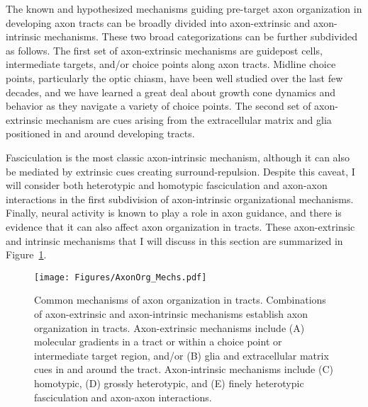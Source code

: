 \label{sec:MoleculesMechanisms}
The known and hypothesized mechanisms guiding pre-target axon organization in developing axon tracts can be broadly divided into axon-extrinsic and axon-intrinsic mechanisms.
These two broad categorizations can be further subdivided as follows.
The first set of axon-extrinsic mechanisms are guidepost cells, intermediate targets, and/or choice points along axon tracts.
Midline choice points, particularly the optic chiasm, have been well studied over the last few decades, and we have learned a great deal about growth cone dynamics and behavior as they navigate a variety of choice points.
The second set of axon-extrinsic mechanism are cues arising from the extracellular matrix and glia positioned in and around developing tracts.

Fasciculation is the most classic axon-intrinsic mechanism, although it can also be mediated by extrinsic cues creating surround-repulsion.
Despite this caveat, I will consider both heterotypic and homotypic fasciculation and axon-axon interactions in the first subdivision of axon-intrinsic organizational mechanisms.
Finally, neural activity is known to play a role in axon guidance, and there is evidence that it can also affect axon organization in tracts.
These axon-extrinsic and intrinsic mechanisms that I will discuss in this section are summarized in Figure~\ref{AxonOrgMechs}.
\begin{figure}[hbtp]
    \begin{center}
    \texttt{[image: Figures/AxonOrg\_Mechs.pdf]}
    \caption[Common mechanisms of axon organization in tracts.]
    {Common mechanisms of axon organization in tracts.
    Combinations of axon-extrinsic and axon-intrinsic mechanisms establish axon organization in tracts.
    Axon-extrinsic mechanisms include (A) molecular gradients in a tract or within a choice point or intermediate target region, and/or (B) glia and extracellular matrix cues in and around the tract.
    Axon-intrinsic mechanisms include (C) homotypic, (D) grossly heterotypic, and (E) finely heterotypic fasciculation and axon-axon interactions.}
    \label{AxonOrgMechs}
    \end{center}
\end{figure}
